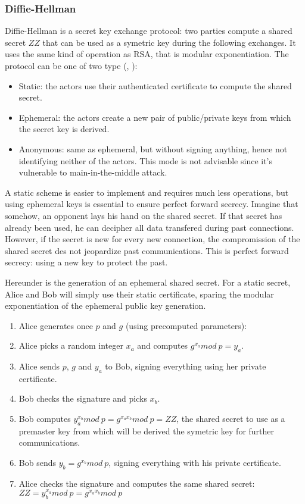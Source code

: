 \subsubsection{Diffie-Hellman}
Diffie-Hellman is a secret key exchange protocol: two parties compute a shared secret $ZZ$ that can be used as a symetric key during the following exchanges.
It uses the same kind of operation as RSA, that is modular exponentiation.
The protocol can be one of two type (\cite{rfc2631}, \cite{Frankel:2005:SGI:2206289}):
\begin{itemize}
	\item Static: the actors use their authenticated certificate to compute the shared secret.
	\item Ephemeral: the actors create a new pair of public/private keys from which the secret key is derived.
	\item Anonymous: same as ephemeral, but without signing anything, hence not identifying neither of the actors. This mode is not advisable since it's vulnerable to main-in-the-middle attack.
\end{itemize}
A static scheme is easier to implement and requires much less operations, but using ephemeral keys is essential to ensure perfect forward secrecy.
Imagine that somehow, an opponent lays his hand on the shared secret.
If that secret has already been used, he can decipher all data transfered during past connections.
However, if the secret is new for every new connection, the compromission of the shared secret des not jeopardize past communications.
This is perfect forward secrecy: using a new key to protect the past.

Hereunder is the generation of an ephemeral shared secret.
For a static secret, Alice and Bob will simply use their static certificate, sparing the modular exponentiation of the ephemeral public key generation.
\begin{enumerate}
	\item Alice generates once $p$ and $g$ (using precomputed parameters):
	\begin{description}[nosep]
		\item[p] large prime number
		\item[g] a generator of $\mathds{Z}_p^*$
	\end{description}
	\item Alice picks a random integer $x_a$ and computes $g^{x_a} mod\ p = y_a$.
	\item Alice sends $p$, $g$ and $y_a$ to Bob, signing everything using her private certificate.
	\item Bob checks the signature and picks $x_b$.
	\item Bob computes $y_a^{x_b} mod\ p = g^{x_a x_b} mod\ p = ZZ$, the shared secret to use as a premaster key from which will be derived the symetric key for further communications.
	\item Bob sends $y_b = g^{x_b} mod\ p$, signing everything with his private certificate.
	\item Alice checks the signature and computes the same shared secret: $ZZ = y_b^{x_a} mod\ p = g^{x_a x_b} mod\ p$
\end{enumerate}

